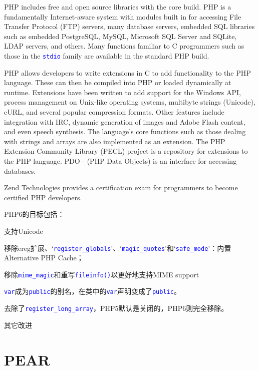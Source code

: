 PHP includes free and open source libraries with the core build. PHP is a fundamentally Internet-aware system with modules built in for accessing File Transfer Protocol (FTP) servers, many database servers, embedded SQL libraries such as embedded PostgreSQL, MySQL, Microsoft SQL Server and SQLite, LDAP servers, and others. Many functions familiar to C programmers such as those in the \textcolor{Blue}{\texttt{stdio}} family are available in the standard PHP build.


PHP allows developers to write extensions in C to add functionality to the PHP language. These can then be compiled into PHP or loaded dynamically at runtime. Extensions have been written to add support for the Windows API, process management on Unix-like operating systems, multibyte strings (Unicode), cURL, and several popular compression formats. Other features include integration with IRC, dynamic generation of images and Adobe Flash content, and even speech synthesis. The language's core functions such as those dealing with strings and arrays are also implemented as an extension. The PHP Extension Community Library (PECL) project is a repository for extensions to the PHP language. PDO - (PHP Data Objects) is an interface for accessing databases.

Zend Technologies provides a certification exam for programmers to become certified PHP developers.

PHP6的目标包括：

\begin{compactitem}
\item 支持Unicode
\item 移除ereg扩展、`\textcolor{Blue}{\texttt{register\_globals}}'、`\textcolor{Blue}{\texttt{magic\_quotes}}'和`\textcolor{Blue}{\texttt{safe\_mode}}'：内置Alternative PHP Cache；
\item 移除\textcolor{Blue}{\texttt{mime\_magic}}和重写\textcolor{Blue}{\texttt{fileinfo()}}以更好地支持MIME support
\item \textcolor{Blue}{\texttt{var}}成为\textcolor{Blue}{\texttt{public}}的别名，在类中的\textcolor{Blue}{\texttt{var}}声明变成了\textcolor{Blue}{\texttt{public}}。
\item 去除了\textcolor{Blue}{\texttt{register\_long\_array}}，PHP5默认是关闭的，PHP6则完全移除。
\item 其它改进
\end{compactitem}


\section{PEAR}


